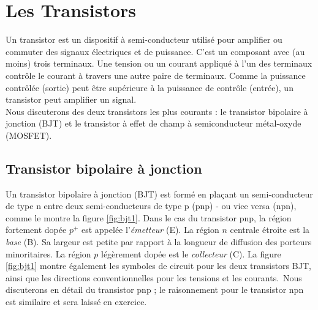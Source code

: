 \chapter{Les Transistors}

Un transistor est un dispositif à semi-conducteur utilisé pour amplifier ou commuter des signaux électriques et de puissance. C'est un composant avec (au moins) trois terminaux. Une tension ou un courant appliqué à l'un des terminaux contrôle le courant à travers une autre paire de terminaux. Comme la puissance contrôlée (sortie) peut être supérieure à la puissance de contrôle (entrée), un transistor peut amplifier un signal.\\
Nous discuterons des deux transistors les plus courants : le transistor bipolaire à jonction (BJT) et le transistor à effet de champ à semiconducteur métal-oxyde (MOSFET).

\section{Transistor bipolaire à jonction}
\label{sec:bipolar_junction}
Un transistor bipolaire à jonction (BJT) est formé en plaçant un semi-conducteur de type n entre deux semi-conducteurs de type p (pnp) - ou vice versa (npn), comme le montre la figure \ref{fig:bjt1}. Dans le cas du transistor pnp, la région fortement dopée $p^+$ est appelée l'\emph{émetteur} (E). La région $n$ centrale étroite est la \emph{base} (B). Sa largeur est petite par rapport à la longueur de diffusion des porteurs minoritaires. La région $p$ légèrement dopée est le \emph{collecteur} (C). La figure \ref{fig:bjt1} montre également les symboles de circuit pour les deux transistors BJT, ainsi que les directions conventionnelles pour les tensions et les courants.\
Nous discuterons en détail du transistor pnp ; le raisonnement pour le transistor npn est similaire et sera laissé en exercice.

